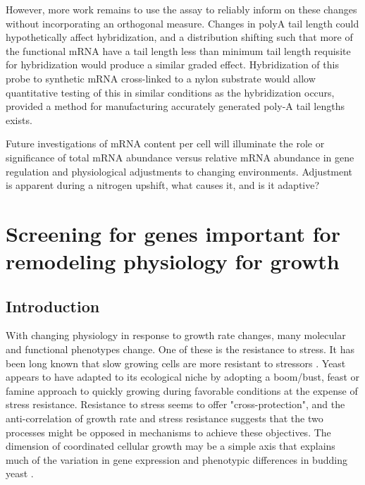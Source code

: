 However, more work remains to use the assay to reliably inform on
these changes without incorporating an orthogonal measure.
Changes in polyA tail length could hypothetically affect
hybridization, and a distribution shifting such that more of the
functional mRNA have a tail length less than minimum tail length
requisite for hybridization would produce a similar graded effect.
Hybridization of this probe to synthetic mRNA cross-linked to a nylon
substrate would allow quantitative testing of this in similar
conditions as the hybridization occurs, provided a method for
manufacturing accurately generated poly-A tail lengths exists.

Future investigations of mRNA content per cell will illuminate
the role or significance of total mRNA abundance 
versus relative mRNA abundance in gene regulation and physiological
adjustments to changing environments. Adjustment is apparent during a 
nitrogen upshift, what causes it, and is it adaptive?

\section{Screening for genes important for remodeling physiology for
growth}

\subsection{Introduction}



With changing physiology in response to growth rate changes, many
molecular and functional phenotypes change. One of these is the
resistance to stress. 
It has been long known that slow growing cells are more resistant to
stressors
\parencite{sherman1923physiological,elliott1993stress,lu2009slow}.
Yeast appears to have adapted to its ecological niche by adopting a
boom/bust, feast or famine approach to quickly
growing during favorable conditions at the expense of stress
resistance. 
Resistance to stress seems to offer "cross-protection", and the
anti-correlation of growth rate and stress resistance suggests that
the two processes might be opposed in mechanisms to
achieve these objectives.
The dimension of coordinated cellular growth may be a simple axis that
explains much of the variation in gene expression and phenotypic
differences in budding yeast
\parencite{brauer2008coordination,lu2009slow}.

